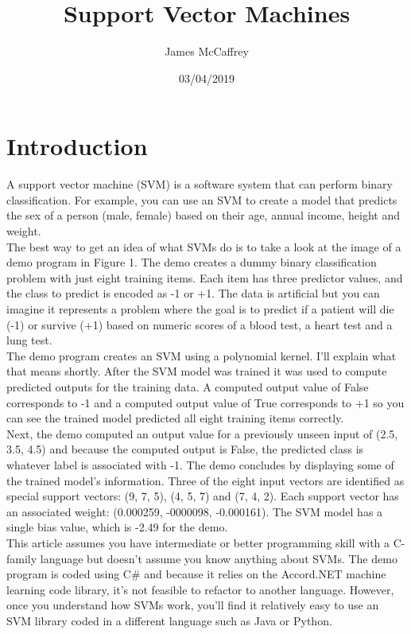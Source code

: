 \documentclass[13pt]{article}
\title{\textbf{Support Vector Machines}}
\author{James McCaffrey}
\date{03/04/2019}
\begin{document}
\maketitle
\thispagestyle{empty}

\section{Introduction}
A support vector machine (SVM) is a software system that can perform binary classification. For example, you can use an SVM to create a model that predicts the sex of a person (male, female) based on their age, annual income, height and weight.\\

\noindent
The best way to get an idea of what SVMs do is to take a look at the image of a demo program in Figure 1. The demo creates a dummy binary classification problem with just eight training items. Each item has three predictor values, and the class to predict is encoded as -1 or +1. The data is artificial but you can imagine it represents a problem where the goal is to predict if a patient will die (-1) or survive (+1) based on numeric scores of a blood test, a heart test and a lung test.\\

\noindent
The demo program creates an SVM using a polynomial kernel. I'll explain what that means shortly. After the SVM model was trained it was used to compute predicted outputs for the training data. A computed output value of False corresponds to -1 and a computed output value of True corresponds to +1 so you can see the trained model predicted all eight training items correctly.\\

\noindent
Next, the demo computed an output value for a previously unseen input of (2.5, 3.5, 4.5) and because the computed output is False, the predicted class is whatever label is associated with -1. The demo concludes by displaying some of the trained model's information. Three of the eight input vectors are identified as special support vectors: (9, 7, 5), (4, 5, 7) and (7, 4, 2). Each support vector has an associated weight: (0.000259, -0000098, -0.000161). The SVM model has a single bias value, which is -2.49 for the demo.\\

\noindent
This article assumes you have intermediate or better programming skill with a C-family language but doesn't assume you know anything about SVMs. The demo program is coded using C\# and because it relies on the Accord.NET machine learning code library, it's not feasible to refactor to another language. However, once you understand how SVMs work, you'll find it relatively easy to use an SVM library coded in a different language such as Java or Python.\\
\end{document}
